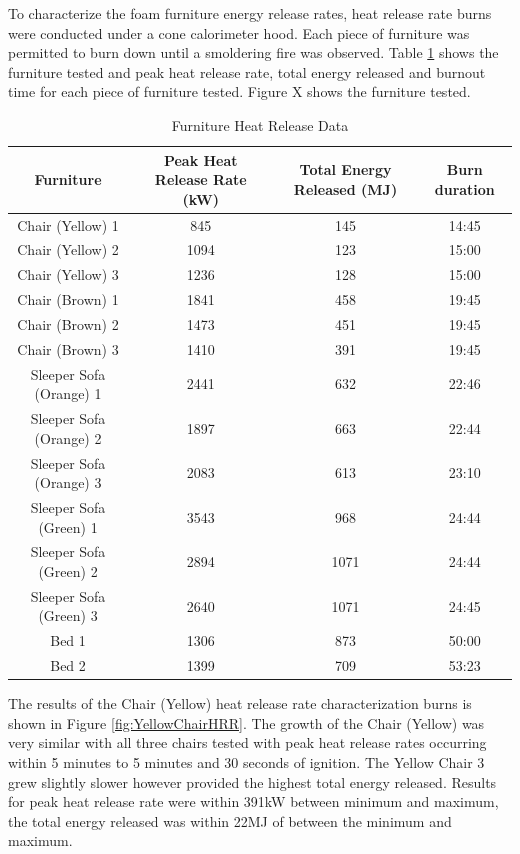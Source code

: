 \documentclass{article}
\begin{document}
To characterize the foam furniture energy release rates, heat release rate burns were conducted under a cone calorimeter hood. Each piece of furniture was permitted to burn down until a smoldering fire was observed. Table \ref{table:FurnitureHRR_Data} shows the furniture tested and peak heat release rate, total energy released and burnout time for each piece of furniture tested. Figure X shows the furniture tested. 

\begin{table}[H]
	\caption{Furniture Heat Release Data}
	\begin{tabular}{|c|c|c|c|}
		\hline
		Furniture & Peak Heat Release Rate (kW) & Total Energy Released (MJ) & Burn duration \\ \hline \hline
		Chair (Yellow) 1 & 845 & 145 & 14:45 \\ \hline
		Chair (Yellow) 2 & 1094 & 123 & 15:00 \\ \hline
		Chair (Yellow) 3 & 1236 & 128 & 15:00 \\ \hline
		Chair (Brown) 1 & 1841 & 458 & 19:45 \\ \hline
		Chair (Brown) 2 & 1473 & 451 & 19:45 \\ \hline
		Chair (Brown) 3 & 1410 & 391 & 19:45 \\ \hline
		Sleeper Sofa (Orange) 1  & 2441 & 632 & 22:46 \\ \hline
		Sleeper Sofa (Orange) 2  & 1897 & 663 & 22:44 \\ \hline
		Sleeper Sofa (Orange) 3  & 2083 & 613 & 23:10 \\ \hline
		Sleeper Sofa (Green) 1  & 3543 & 968 & 24:44 \\ \hline
		Sleeper Sofa (Green) 2  & 2894 & 1071 & 24:44 \\ \hline
		Sleeper Sofa (Green) 3  & 2640 & 1071 & 24:45 \\ \hline
		Bed 1 & 1306 & 873 & 50:00 \\ \hline
		Bed 2 & 1399 & 709 & 53:23 \\ \hline
	\end{tabular}
	\label{table:FurnitureHRR_Data}
\end{table}

The results of the Chair (Yellow) heat release rate characterization burns is shown in Figure \ref{fig:YellowChairHRR}. The growth of the Chair (Yellow) was very similar with all three chairs tested with peak heat release rates occurring within 5 minutes to 5 minutes and 30 seconds of ignition. The Yellow Chair 3 grew slightly slower however provided the highest total energy released. Results for peak heat release rate were within 391kW between minimum and maximum, the total energy released was within 22MJ of between the minimum and maximum. 
\end{document}
